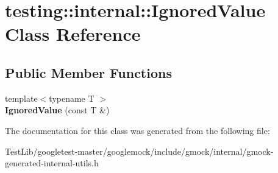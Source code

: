 \hypertarget{classtesting_1_1internal_1_1IgnoredValue}{}\section{testing\+:\+:internal\+:\+:Ignored\+Value Class Reference}
\label{classtesting_1_1internal_1_1IgnoredValue}
\subsection*{Public Member Functions}
\begin{DoxyCompactItemize}
\item 
\mbox{\label{classtesting_1_1internal_1_1IgnoredValue_a6c72839c07a9da8d027efb253144bd91}} 
{\footnotesize template$<$typename T $>$ }\\{\bfseries Ignored\+Value} (const T \&)
\end{DoxyCompactItemize}


The documentation for this class was generated from the following file\+:\begin{DoxyCompactItemize}
\item 
Test\+Lib/googletest-\/master/googlemock/include/gmock/internal/gmock-\/generated-\/internal-\/utils.\+h\end{DoxyCompactItemize}
